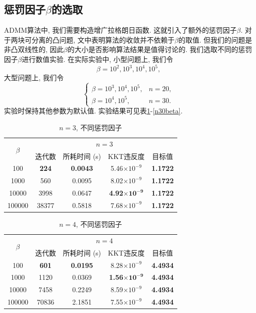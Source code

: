 \documentclass[UTF8,10.5pt,a4paper]{ctexart}
\theoremstyle{definition}
\theoremstyle{definition}
\begin{document}
\subsection{惩罚因子$\beta$的选取}
ADMM算法中, 我们需要构造增广拉格朗日函数. 这就引入了额外的惩罚因子$\beta$. 对于两块可分离的凸问题, 文\cite{Boyd2011Distributed}中表明算法的收敛并不依赖于$\beta$的取值. 但我们的问题是非凸双线性的, 因此$\beta$的大小是否影响算法结果是值得讨论的. 我们选取不同的惩罚因子$\beta$进行数值实验. 在实际实验中, 小型问题上, 我们令
$$\beta=10^2,10^3,10^4,10^5,$$
大型问题上, 我们令
$$\left\{\begin{array}{ll}
\beta=10^3,10^4,10^5, & n=20,\\
\beta=10^4,10^5, & n=30.
\end{array}\right.$$
实验时保持其他参数为默认值. 实验结果可见表\ref{n3beta}-\ref{n30beta}. 
\begin{table}[htbp]
	\renewcommand{\captionfont}{\small}
    \centering
    \caption{$n=3$, 不同惩罚因子}
    \label{n3beta}
    \vskip 4mm
    \begin{tabular}{c|c|c|c|c}
        \hline
        \multirow{2}{*}{$\beta$} & \multicolumn{4}{c}{$n=3$}\\\cline{2-5}
          & 迭代数 & 所耗时间 (s) & KKT违反度 & 目标值\\\hline
        100 & \textbf{224} & \textbf{0.0043} & 5.46$\times10^{-9}$ & \textbf{1.1722}\\\hline
        1000 & 560 & 0.0095 & 8.02$\times10^{-9}$ & \textbf{1.1722}\\\hline
        10000 & 3998 & 0.0647 & \textbf{4.92$\mathbf{\times10^{-9}}$} & \textbf{1.1722}\\\hline
        100000 & 38377 & 0.5818 & 7.68$\times10^{-9}$ & \textbf{1.1722}\\\hline
    \end{tabular}
\end{table}

\begin{table}[htbp]
	\renewcommand{\captionfont}{\small}
    \centering
    \caption{$n=4$, 不同惩罚因子}
    \label{n4beta}
    \vskip 4mm
    \begin{tabular}{c|c|c|c|c}
        \hline
        \multirow{2}{*}{$\beta$} & \multicolumn{4}{c}{$n=4$}\\\cline{2-5}
          & 迭代数 & 所耗时间 (s) & KKT违反度 & 目标值\\\hline
        100 & \textbf{601} & \textbf{0.0195} & 8.28$\times10^{-9}$ & \textbf{4.4934}\\\hline
        1000 & 1120 & 0.0369 & \textbf{1.56$\mathbf{\times10^{-9}}$} & \textbf{4.4934}\\\hline
        10000 & 7458 & 0.2249 & 8.59$\times10^{-9}$ & \textbf{4.4934}\\\hline
        100000 & 70836 & 2.1851 & 7.55$\times10^{-9}$ & \textbf{4.4934}\\\hline
    \end{tabular}
\end{table}
\end{document}
